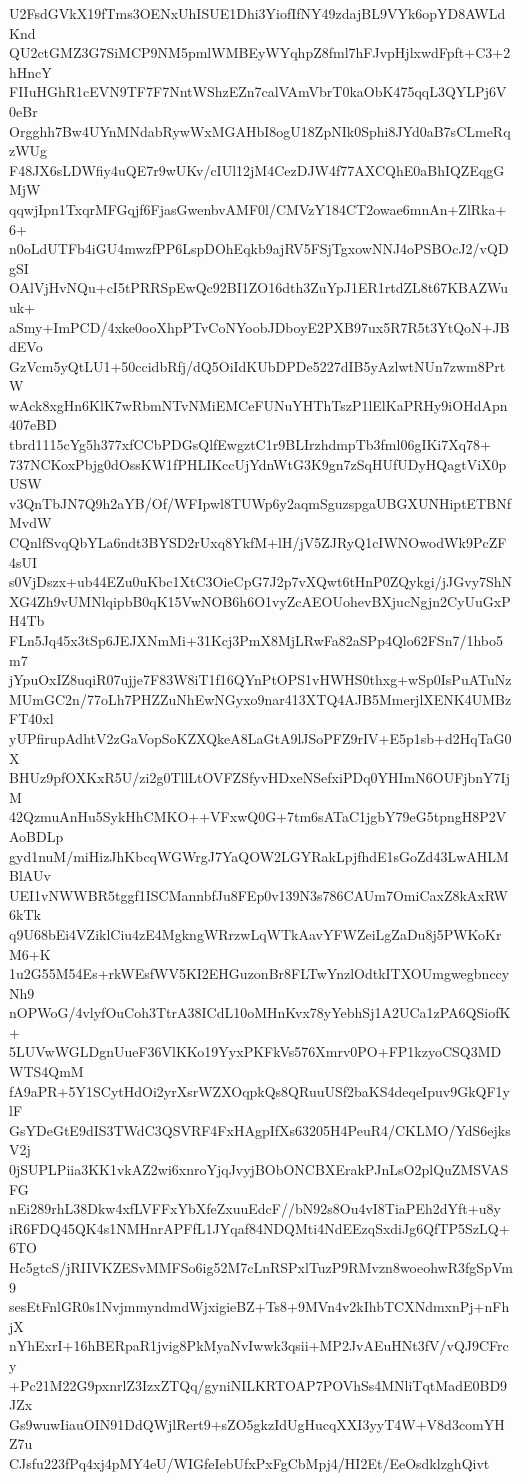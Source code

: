 U2FsdGVkX19fTms3OENxUhISUE1Dhi3YiofIfNY49zdajBL9VYk6opYD8AWLdKnd
QU2ctGMZ3G7SiMCP9NM5pmlWMBEyWYqhpZ8fml7hFJvpHjlxwdFpft+C3+2hHncY
FIIuHGhR1cEVN9TF7F7NntWShzEZn7calVAmVbrT0kaObK475qqL3QYLPj6V0eBr
Orgghh7Bw4UYnMNdabRywWxMGAHbI8ogU18ZpNIk0Sphi8JYd0aB7sCLmeRqzWUg
F48JX6sLDWfiy4uQE7r9wUKv/cIUl12jM4CezDJW4f77AXCQhE0aBhIQZEqgGMjW
qqwjIpn1TxqrMFGqjf6FjasGwenbvAMF0l/CMVzY184CT2owae6mnAn+ZlRka+6+
n0oLdUTFb4iGU4mwzfPP6LspDOhEqkb9ajRV5FSjTgxowNNJ4oPSBOcJ2/vQDgSI
OAlVjHvNQu+cI5tPRRSpEwQc92BI1ZO16dth3ZuYpJ1ER1rtdZL8t67KBAZWuuk+
aSmy+ImPCD/4xke0ooXhpPTvCoNYoobJDboyE2PXB97ux5R7R5t3YtQoN+JBdEVo
GzVcm5yQtLU1+50ccidbRfj/dQ5OiIdKUbDPDe5227dIB5yAzlwtNUn7zwm8PrtW
wAck8xgHn6KlK7wRbmNTvNMiEMCeFUNuYHThTszP1lElKaPRHy9iOHdApn407eBD
tbrd1115cYg5h377xfCCbPDGsQlfEwgztC1r9BLIrzhdmpTb3fml06gIKi7Xq78+
737NCKoxPbjg0dOssKW1fPHLIKccUjYdnWtG3K9gn7zSqHUfUDyHQagtViX0pUSW
v3QnTbJN7Q9h2aYB/Of/WFIpwl8TUWp6y2aqmSguzspgaUBGXUNHiptETBNfMvdW
CQnlfSvqQbYLa6ndt3BYSD2rUxq8YkfM+lH/jV5ZJRyQ1cIWNOwodWk9PcZF4sUI
s0VjDszx+ub44EZu0uKbc1XtC3OieCpG7J2p7vXQwt6tHnP0ZQykgi/jJGvy7ShN
XG4Zh9vUMNlqipbB0qK15VwNOB6h6O1vyZcAEOUohevBXjucNgjn2CyUuGxPH4Tb
FLn5Jq45x3tSp6JEJXNmMi+31Kcj3PmX8MjLRwFa82aSPp4Qlo62FSn7/1hbo5m7
jYpuOxIZ8uqiR07ujje7F83W8iT1f16QYnPtOPS1vHWHS0thxg+wSp0IsPuATuNz
MUmGC2n/77oLh7PHZZuNhEwNGyxo9nar413XTQ4AJB5MmerjlXENK4UMBzFT40xl
yUPfirupAdhtV2zGaVopSoKZXQkeA8LaGtA9lJSoPFZ9rIV+E5p1sb+d2HqTaG0X
BHUz9pfOXKxR5U/zi2g0TllLtOVFZSfyvHDxeNSefxiPDq0YHImN6OUFjbnY7IjM
42QzmuAnHu5SykHhCMKO++VFxwQ0G+7tm6sATaC1jgbY79eG5tpngH8P2VAoBDLp
gyd1nuM/miHizJhKbcqWGWrgJ7YaQOW2LGYRakLpjfhdE1sGoZd43LwAHLMBlAUv
UEI1vNWWBR5tggf1ISCMannbfJu8FEp0v139N3s786CAUm7OmiCaxZ8kAxRW6kTk
q9U68bEi4VZiklCiu4zE4MgkngWRrzwLqWTkAavYFWZeiLgZaDu8j5PWKoKrM6+K
1u2G55M54Es+rkWEsfWV5KI2EHGuzonBr8FLTwYnzlOdtkITXOUmgwegbnccyNh9
nOPWoG/4vlyfOuCoh3TtrA38ICdL10oMHnKvx78yYebhSj1A2UCa1zPA6QSiofK+
5LUVwWGLDgnUueF36VlKKo19YyxPKFkVs576Xmrv0PO+FP1kzyoCSQ3MDWTS4QmM
fA9aPR+5Y1SCytHdOi2yrXsrWZXOqpkQs8QRuuUSf2baKS4deqeIpuv9GkQF1ylF
GsYDeGtE9dIS3TWdC3QSVRF4FxHAgpIfXs63205H4PeuR4/CKLMO/YdS6ejksV2j
0jSUPLPiia3KK1vkAZ2wi6xnroYjqJvyjBObONCBXErakPJnLsO2plQuZMSVASFG
nEi289rhL38Dkw4xfLVFFxYbXfeZxuuEdcF//bN92s8Ou4vI8TiaPEh2dYft+u8y
iR6FDQ45QK4s1NMHnrAPFfL1JYqaf84NDQMti4NdEEzqSxdiJg6QfTP5SzLQ+6TO
Hc5gtcS/jRIIVKZESvMMFSo6ig52M7cLnRSPxlTuzP9RMvzn8woeohwR3fgSpVm9
sesEtFnlGR0s1NvjmmyndmdWjxigieBZ+Ts8+9MVn4v2kIhbTCXNdmxnPj+nFhjX
nYhExrI+16hBERpaR1jvig8PkMyaNvIwwk3qsii+MP2JvAEuHNt3fV/vQJ9CFrcy
+Pc21M22G9pxnrlZ3IzxZTQq/gyniNILKRTOAP7POVhSs4MNliTqtMadE0BD9JZx
Gs9wuwIiauOIN91DdQWjlRert9+sZO5gkzIdUgHucqXXI3yyT4W+V8d3comYHZ7u
CJsfu223fPq4xj4pMY4eU/WIGfeIebUfxPxFgCbMpj4/HI2Et/EeOsdklzghQivt
